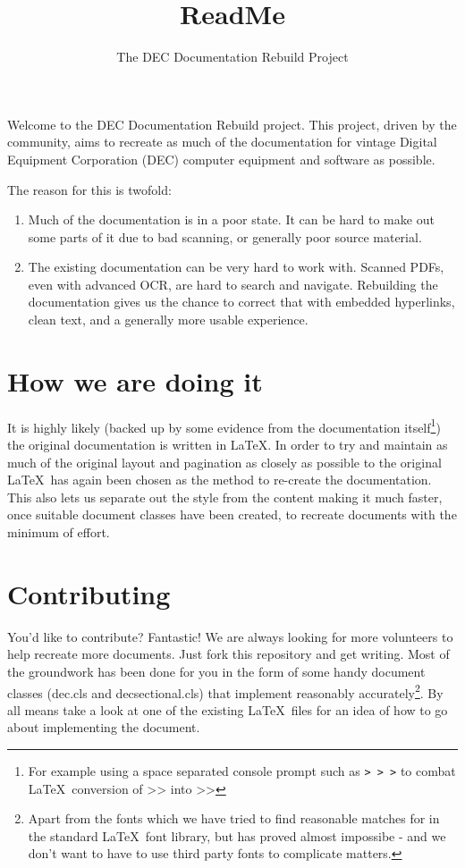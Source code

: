\documentclass{dec}
\title{ReadMe}
\author{The DEC Documentation Rebuild Project}
\begin{document}
\pagestyle{main}

Welcome to the DEC Documentation Rebuild project.  This project, driven by the community, aims to
recreate as much of the documentation for vintage Digital Equipment Corporation (DEC) computer 
equipment and software as possible.

The reason for this is twofold:

\begin{enumerate}

\item 	Much of the documentation is in a poor state. It can be hard to make out some parts of it due to bad scanning,
		or generally poor source material.

\item	The existing documentation can be very hard to work with. Scanned PDFs, even with advanced OCR, are hard to
		search and navigate. Rebuilding the documentation gives us the chance to correct that with embedded hyperlinks,
		clean text, and a generally more usable experience.

\end{enumerate}

\section{How we are doing it}

It is highly likely (backed up by some evidence from the documentation itself\footnote{For example using a space separated console prompt such as {\tt > > >}
to combat \LaTeX\ conversion of {>}{>} into >> }) the original documentation is written in \LaTeX. In order to try and maintain as much of the original layout and pagination as closely
as possible to the original \LaTeX\ has again been chosen as the method to re-create the documentation. This also lets us separate out the style from the content
making it much faster, once suitable document classes have been created, to recreate documents with the minimum of effort.

\section{Contributing}

You'd like to contribute? Fantastic! We are always looking for more volunteers to help recreate more documents. Just fork this repository and get
writing. Most of the groundwork has been done for you in the form of some handy document classes (dec.cls and decsectional.cls) that implement
reasonably accurately\footnote{Apart from the fonts which we have tried to find reasonable matches for in the standard \LaTeX\ font library, but
has proved almost impossibe - and we don't want to have to use third party fonts to complicate matters.}. By all means take a look at one of the
existing \LaTeX\ files for an idea of how to go about implementing the document.
\end{document}
